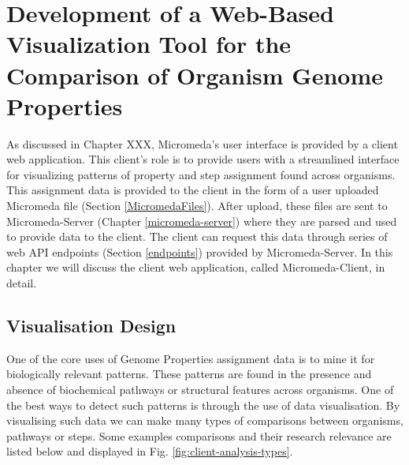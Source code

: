 \chapter{Development of a Web-Based Visualization Tool for the Comparison of Organism Genome Properties} \label{micromeda-client}

As discussed in Chapter XXX, Micromeda's user interface is provided by a client web application. This client's role is to provide users with a streamlined interface for visualizing patterns of property and step assignment found across organisms. This assignment data is provided to the client in the form of a user uploaded Micromeda file (Section \ref{MicromedaFiles}). After upload, these files are sent to Micromeda-Server (Chapter \ref{micromeda-server}) where they are parsed and used to provide data to the client. The client can request this data through series of web API endpoints (Section \ref{endpoints}) provided by Micromeda-Server. In this chapter we will discuss the client web application, called Micromeda-Client, in detail.

\section{Visualisation Design}

One of the core uses of Genome Properties assignment data is to mine it for biologically relevant patterns. These patterns are found in the presence and absence of biochemical pathways or structural features across organisms. One of the best ways to detect such patterns is through the use of data visualisation. By visualising such data we can make many types of comparisons between organisms, pathways or steps. Some examples comparisons and their research relevance are listed below and displayed in Fig. \ref{fig:client-analysis-types}. 

